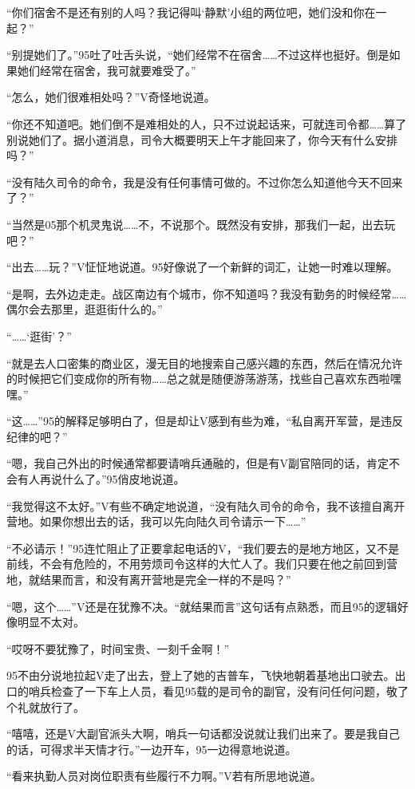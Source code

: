 “你们宿舍不是还有别的人吗？我记得叫‘静默’小组的两位吧，她们没和你在一起？”

“别提她们了。”95吐了吐舌头说，“她们经常不在宿舍……不过这样也挺好。倒是如果她们经常在宿舍，我可就要难受了。”

“怎么，她们很难相处吗？”V奇怪地说道。

“你还不知道吧。她们倒不是难相处的人，只不过说起话来，可就连司令都……算了别说她们了。据小道消息，司令大概要明天上午才能回来了，你今天有什么安排吗？”

“没有陆久司令的命令，我是没有任何事情可做的。不过你怎么知道他今天不回来了？”

“当然是05那个机灵鬼说……不，不说那个。既然没有安排，那我们一起，出去玩吧？”

“出去……玩？”V怔怔地说道。95好像说了一个新鲜的词汇，让她一时难以理解。

“是啊，去外边走走。战区南边有个城市，你不知道吗？我没有勤务的时候经常……偶尔会去那里，逛逛街什么的。”

“……‘逛街’？”

“就是去人口密集的商业区，漫无目的地搜索自己感兴趣的东西，然后在情况允许的时候把它们变成你的所有物……总之就是随便游荡游荡，找些自己喜欢东西啦嘿嘿。”

“这……”95的解释足够明白了，但是却让V感到有些为难，“私自离开军营，是违反纪律的吧？”

“嗯，我自己外出的时候通常都要请哨兵通融的，但是有V副官陪同的话，肯定不会有人再说什么了。”95俏皮地说道。

“我觉得这不太好。”V有些不确定地说道，“没有陆久司令的命令，我不该擅自离开营地。如果你想出去的话，我可以先向陆久司令请示一下……”

“不必请示！”95连忙阻止了正要拿起电话的V，“我们要去的是地方地区，又不是前线，不会有危险的，不用劳烦司令这样的大忙人了。我们只要在他之前回到营地，就结果而言，和没有离开营地是完全一样的不是吗？”

“嗯，这个……”V还是在犹豫不决。“就结果而言”这句话有点熟悉，而且95的逻辑好像明显不太对。

“哎呀不要犹豫了，时间宝贵、一刻千金啊！”

95不由分说地拉起V走了出去，登上了她的吉普车，飞快地朝着基地出口驶去。出口的哨兵检查了一下车上人员，看见95载的是司令的副官，没有问任何问题，敬了个礼就放行了。

“嘻嘻，还是V大副官派头大啊，哨兵一句话都没说就让我们出来了。要是我自己的话，可得求半天情才行。”一边开车，95一边得意地说道。

“看来执勤人员对岗位职责有些履行不力啊。”V若有所思地说道。

